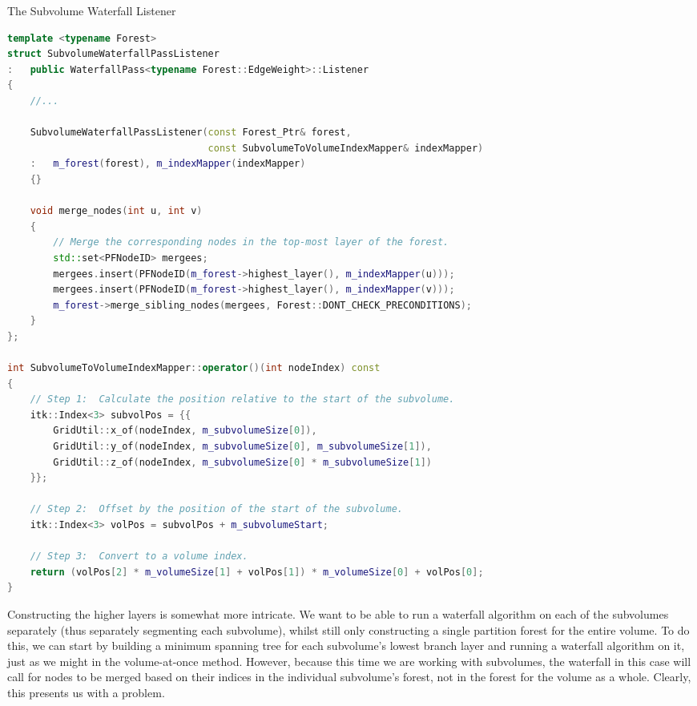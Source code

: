 \begin{stulisting}[p]
\caption{The Subvolume Waterfall Listener}
\label{code:segmentation-ipfconstruction-subvolume-waterfalllistener}
\begin{lstlisting}[style=Default,language=C++]
template <typename Forest>
struct SubvolumeWaterfallPassListener
:	public WaterfallPass<typename Forest::EdgeWeight>::Listener
{
	//...

	SubvolumeWaterfallPassListener(const Forest_Ptr& forest,
								   const SubvolumeToVolumeIndexMapper& indexMapper)
	:	m_forest(forest), m_indexMapper(indexMapper)
	{}

	void merge_nodes(int u, int v)
	{
		// Merge the corresponding nodes in the top-most layer of the forest.
		std::set<PFNodeID> mergees;
		mergees.insert(PFNodeID(m_forest->highest_layer(), m_indexMapper(u)));
		mergees.insert(PFNodeID(m_forest->highest_layer(), m_indexMapper(v)));
		m_forest->merge_sibling_nodes(mergees, Forest::DONT_CHECK_PRECONDITIONS);
	}
};

int SubvolumeToVolumeIndexMapper::operator()(int nodeIndex) const
{
	// Step 1:	Calculate the position relative to the start of the subvolume.
	itk::Index<3> subvolPos = {{
		GridUtil::x_of(nodeIndex, m_subvolumeSize[0]),
		GridUtil::y_of(nodeIndex, m_subvolumeSize[0], m_subvolumeSize[1]),
		GridUtil::z_of(nodeIndex, m_subvolumeSize[0] * m_subvolumeSize[1])
	}};

	// Step 2:	Offset by the position of the start of the subvolume.
	itk::Index<3> volPos = subvolPos + m_subvolumeStart;

	// Step 3:	Convert to a volume index.
	return (volPos[2] * m_volumeSize[1] + volPos[1]) * m_volumeSize[0] + volPos[0];
}
\end{lstlisting}
\end{stulisting}


Constructing the higher layers is somewhat more intricate. We want to be able to run a waterfall algorithm on each of the subvolumes separately (thus separately segmenting each subvolume), whilst still only constructing a single partition forest for the entire volume. To do this, we can start by building a minimum spanning tree for each subvolume's lowest branch layer and running a waterfall algorithm on it, just as we might in the volume-at-once method. However, because this time we are working with subvolumes, the waterfall in this case will call for nodes to be merged based on their indices in the individual subvolume's forest, not in the forest for the volume as a whole. Clearly, this presents us with a problem.


